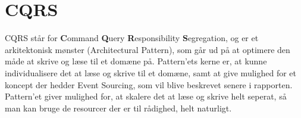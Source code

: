 \chapter{CQRS}

CQRS står for \textbf{C}ommand \textbf{Q}uery \textbf{R}esponsibility \textbf{S}egregation, og er et arkitektonisk mønster (Architectural Pattern), som går ud på at optimere den måde at skrive og læse til et domæne på. Pattern'ets kerne er, at kunne individualisere det at læse og skrive til et domæne, samt at give mulighed for et koncept der hedder Event Sourcing, som vil blive beskrevet senere i rapporten. Pattern'et giver mulighed for, at skalere det at læse og skrive helt seperat, så man kan bruge de resourcer der er til rådighed, helt naturligt.
